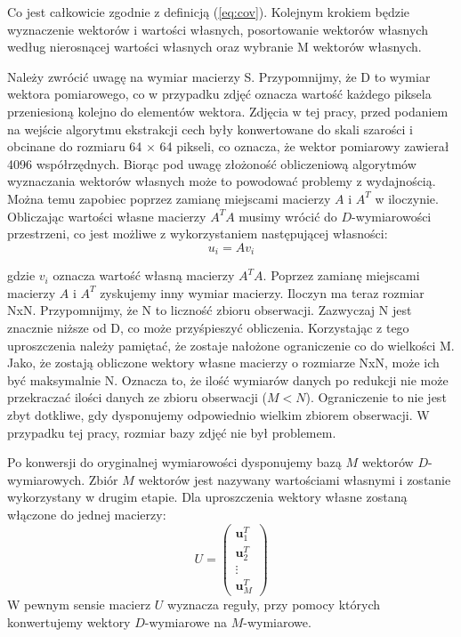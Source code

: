 \documentclass[oneside, eng]{mgr}
\newcommand{\bb}{\textbf}
\begin{document}
Co jest całkowicie zgodnie z definicją (\ref{eq:cov}). Kolejnym krokiem będzie wyznaczenie wektorów i wartości własnych, posortowanie wektorów własnych według nierosnącej wartości własnych oraz wybranie M wektorów własnych. 

Należy zwrócić uwagę na wymiar macierzy S. Przypomnijmy, że D to wymiar wektora pomiarowego, co w przypadku zdjęć oznacza wartość każdego piksela przeniesioną kolejno do elementów wektora. Zdjęcia w tej pracy, przed podaniem na wejście algorytmu ekstrakcji cech były konwertowane do skali szarości i obcinane do rozmiaru 64 $\times$ 64 pikseli, co oznacza, że wektor pomiarowy zawierał 4096 współrzędnych. Biorąc pod uwagę złożoność obliczeniową algorytmów wyznaczania wektorów własnych może to powodować problemy z wydajnością. Można temu zapobiec poprzez zamianę miejscami macierzy $A$ i $A^T$ w iloczynie. Obliczając wartości własne macierzy $A^T A$ musimy wrócić do $D$-wymiarowości przestrzeni, co jest możliwe z wykorzystaniem następującej własności:
\begin{equation}
	u_i = A v_i
\end{equation}

gdzie $v_i$ oznacza wartość własną macierzy $A^T A$. Poprzez zamianę miejscami macierzy $A$ i $A^T$ zyskujemy inny wymiar macierzy. Iloczyn ma teraz rozmiar NxN. Przypomnijmy, że N to liczność zbioru obserwacji. Zazwyczaj N jest znacznie niższe od D, co może przyśpieszyć obliczenia. Korzystając z tego uproszczenia należy pamiętać, że zostaje nałożone ograniczenie co do wielkości M. Jako, że zostają obliczone wektory własne macierzy o rozmiarze NxN, może ich być maksymalnie N. Oznacza to, że ilość wymiarów danych po redukcji nie może przekraczać ilości danych ze zbioru obserwacji ($M < N$). Ograniczenie to nie jest zbyt dotkliwe, gdy dysponujemy odpowiednio wielkim zbiorem obserwacji. W przypadku tej pracy, rozmiar bazy zdjęć nie był problemem.

Po konwersji do oryginalnej wymiarowości dysponujemy bazą $M$ wektorów $D$-wymiarowych. Zbiór $M$ wektorów jest nazywany wartościami własnymi i zostanie wykorzystany w drugim etapie. Dla uproszczenia wektory własne zostaną włączone do jednej macierzy:
\begin{equation}
	U = 
	\left( \begin{array}{l}
		\bb{u}_1^T \\
		\bb{u}_2^T \\
		\vdots	 \\
		\bb{u}_M^T
	\end{array} \right)
\end{equation}
W pewnym sensie macierz $U$ wyznacza reguły, przy pomocy których konwertujemy wektory $D$-wymiarowe na $M$-wymiarowe.
\end{document}
